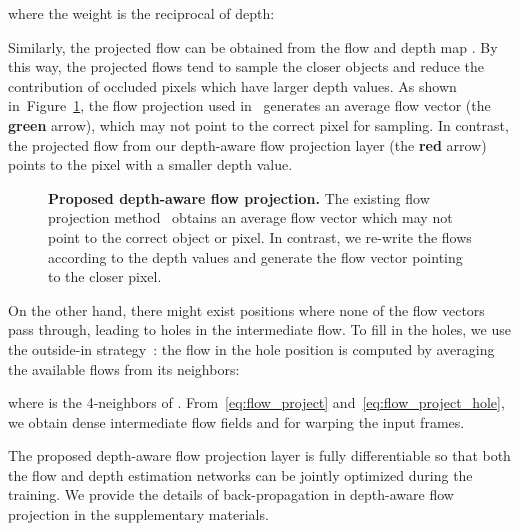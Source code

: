 \documentclass[10pt,twocolumn,letterpaper]{article}
\def\red#1{\textcolor{MyRed}{#1}}
\def\green#1{\textcolor{MyGreen}{#1}}
\newcommand{\figref}[1]{Figure~\ref{fig:#1}}
\newcommand{\eqnref}[1]{\eqref{eq:#1}}
\begin{document}
where the weight  is the reciprocal of depth:

Similarly, the projected flow  can be obtained from the flow  and depth map .
By this way, the projected flows tend to sample the closer objects and reduce the contribution of occluded pixels which have larger depth values.
As shown in~\figref{flow-project}, the flow projection used in~\cite{bao2018MEMC-Net} generates an average flow vector (the \green{\textbf{green}} arrow), which may not point to the correct pixel for sampling.
In contrast, the projected flow from our depth-aware flow projection layer (the \red{\textbf{red}} arrow) points to the pixel with a smaller depth value.


	
	\begin{figure}[!t]
	\footnotesize
	\centering	
	\begin{minipage}{0.7\linewidth}
	\end{minipage}
	\hfill

	\vspace{-5pt}
	\caption{
		\textbf{Proposed depth-aware flow projection.}
The existing flow projection method~\cite{bao2018MEMC-Net} obtains an average flow vector which may not point to the correct object or pixel.
In contrast, we re-write the flows according to the depth values and generate the flow vector pointing to the closer pixel.
}
 	\vspace{-10pt}
	\label{fig:flow-project} 
\end{figure}
 	
	On the other hand, there might exist positions where none of the flow vectors pass through, leading to holes in the intermediate flow.
To fill in the holes, we use the outside-in strategy~\cite{baker2011database}: the flow in the hole position is computed by averaging the available flows from its neighbors:

where  is the 4-neighbors of . 
From~\eqnref{flow_project} and~\eqnref{flow_project_hole}, we obtain dense intermediate flow fields  and  for warping the input frames.


	The proposed depth-aware flow projection layer is fully differentiable so that both the flow and depth estimation networks can be jointly optimized during the training.
We provide the details of back-propagation in depth-aware flow projection in the supplementary materials.
	
	
	
\end{document}
